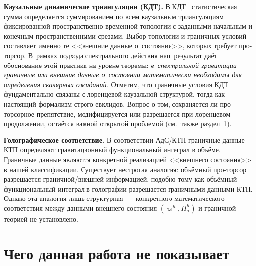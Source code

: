 \documentclass[12pt,a4paper]{article}
\theoremstyle{plain}
\theoremstyle{definition}
\theoremstyle{remark}
\begin{document}
\medskip

\noindent\textbf{Каузальные динамические триангуляции (КДТ).}\quad
В КДТ~\cite{AJL:2005,AJL:2012} статистическая сумма определяется
суммированием по всем каузальным триангуляциям фиксированной
пространственно-временной топологии с заданными начальным и конечным
пространственными срезами.  Выбор топологии и граничных условий
составляет именно те <<внешние данные о~состоянии>>, которых
требует про-торсор.  В~рамках подхода спектрального действия
наш результат даёт обоснование этой практики на уровне теоремы:
\emph{в~спектральной гравитации граничные или внешние данные
о~состоянии математически необходимы для определения скалярных
ожиданий.}
Отметим, что граничные условия КДТ фундаментально связаны с
лоренцевой каузальной структурой, тогда как настоящий формализм
строго евклидов.  Вопрос о том, сохраняется ли про-торсорное
препятствие, модифицируется или разрешается при лоренцевом
продолжении, остаётся важной открытой проблемой
(см.\ также раздел~\ref{sec:not-shown}).

\medskip

\noindent\textbf{Голографическое соответствие.}\quad
В соответствии АдС/КТП граничные данные КТП определяют
гравитационный функциональный интеграл в объёме.  Граничные данные
являются конкретной реализацией <<внешнего состояния>> в нашей
классификации.  Существует нестрогая аналогия: объёмный про-торсор
разрешается граничной/внешней информацией, подобно тому как
объёмный функциональный интеграл в голографии разрешается
граничными данными КТП.  Однако эта аналогия лишь структурная~---
конкретного математического соответствия между данными внешнего
состояния $({\varpi}^\hbar, H_\sigma^\hbar)$ и граничной теорией
не установлено.


\section{Чего данная работа не показывает}
\label{sec:not-shown}
\end{document}
